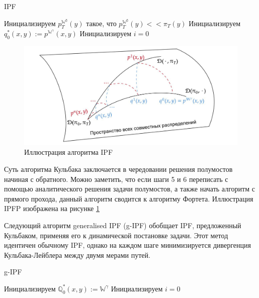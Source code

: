 \begin{algorithm}
\caption{IPF}\label{alg:ipfp}
Инициализируем $p_T^{\mathbb{W^\gamma}}(y)$ такое, что $p_T^{\mathbb{W^\gamma}}(y)<<\pi_T(y)$\;
Инициализируем $q_0^*(x,y) := p^{\mathbb{W}^\gamma}(x,y)$\;
Инициализируем $i = 0$\;
\end{algorithm}

\begin{figure}
    \centering
    \includegraphics[width=1\linewidth]{images/ipfp.png}
    \caption{Иллюстрация алгоритма IPF}
    \label{fig:ipfp}
\end{figure}

Суть алгоритма Кульбака заключается в чередовании решения полумостов начиная с обратного. Можно заметить, что если шаги 5 и 6 переписать с помощью аналитического решения задачи полумостов, а также начать алгоритм с прямого прохода, данный алгоритм сводится к алгоритму Фортета. Иллюстрация IPFP изображена на рисунке \ref{fig:ipfp}

Следующий алгоритм generalised IPF (g-IPF) обобщает IPF, предложенный Кульбаком, применяя его к динамической постановке задачи. Этот метод идентичен обычному IPF, однако на каждом шаге минимизируется дивергенция Кульбака-Лейблера между двумя мерами путей. 
\newpage
\begin{algorithm}
\caption{g-IPF}\label{alg:g-ipfp}
Инициализируем $\mathbb{Q}_0^*(x,y) := \mathbb{W}^\gamma$\;
Инициализируем $i = 0$\;

\end{algorithm}

\newpage